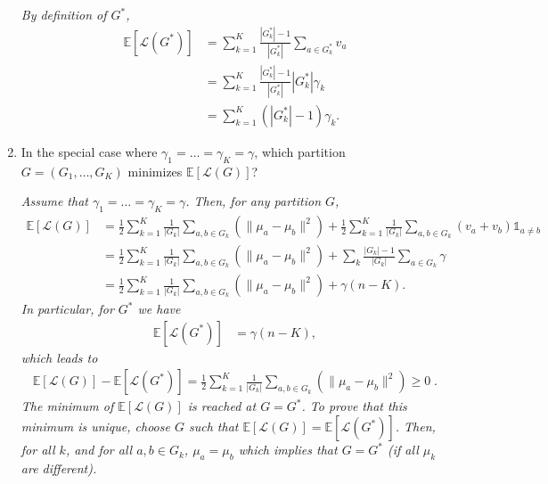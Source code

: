 \documentclass[a4paper,10pt,fleqn]{article}
\newcommand{\E}{\ensuremath{\mathbb{E}}}
\newcommand{\1}{\ensuremath{\mathbbm{1}}}
\newcommand{\crit}{\mathcal{L}}
\begin{document}
\begin{enumerate}
\vspace{.2cm}

{\em
By definition of  $G^*$,  
	\begin{align*}
	\E \left[ \crit(G^*) \right] & =\sum_{k=1}^K \frac{|G^*_k|-1}{|G^*_k|} \sum_{a \in G^*_{k}} v_a\\
	& = \sum_{k=1}^K \frac{|G^*_k|-1}{|G^*_k|} |G^*_k| \gamma_k\\
	& = \sum_{k=1}^K (|G^*_k|-1) \gamma_k.
	\end{align*}
}
\item In the special case where $\gamma_{1}=\ldots=\gamma_{K}=\gamma$, which partition $G=(G_{1},\ldots,G_{K})$ minimizes $\E[\crit(G)]$?

\vspace{.2cm}

{\em
Assume that $\gamma_1 = \hdots = \gamma_K = \gamma$. Then, for any partition $G$, 
	\begin{align*}
	\E \left[ \crit(G) \right] & = \frac{1}{2}  \sum_{k=1}^K \frac{1}{|G_k|}\sum_{a, b\in G_{k}} \left( \| \mu_a - \mu_b\|^2 \right)
	+ \frac{1}{2}  \sum_{k=1}^K \frac{1}{|G_k|}\sum_{a, b\in G_{k}} \left( v_a + v_b \right) \mathds{1}_{a \neq b}\\
	& = \frac{1}{2}  \sum_{k=1}^K \frac{1}{|G_k|}\sum_{a, b\in G_{k}} \left( \| \mu_a - \mu_b\|^2 \right) + \sum_k \frac{|G_k|-1}{|G_k|} \sum_{a \in G_k} \gamma\\
	& = \frac{1}{2}  \sum_{k=1}^K \frac{1}{|G_k|}\sum_{a, b\in G_{k}} \left( \| \mu_a - \mu_b\|^2 \right) + \gamma(n-K).
	\end{align*}
	In particular, for $G^*$ we have
	\begin{align*}
	\E \left[ \crit(G^*) \right] & = \gamma(n-K),
	\end{align*}
	which leads to 
	\begin{align*}
	\E \left[ \crit(G) \right] - \E \left[ \crit(G^*) \right] = \frac{1}{2}  \sum_{k=1}^K \frac{1}{|G_k|}\sum_{a, b\in G_{k}} \left( \| \mu_a - \mu_b\|^2 \right) \geq 0\;.
	\end{align*}
	The minimum of $\E \left[ \crit(G) \right]$ is reached at $G = G^*$. To prove that this minimum is unique, choose $G$ such that $\E \left[ \crit(G) \right] = \E \left[ \crit(G^*) \right]$. Then, for all $k$, and for all $a,b \in G_k$,  $\mu_a = \mu_b$ which implies that $G = G^*$ (if all $\mu_k$ are different).
}
\end{enumerate}
	
\end{document}
